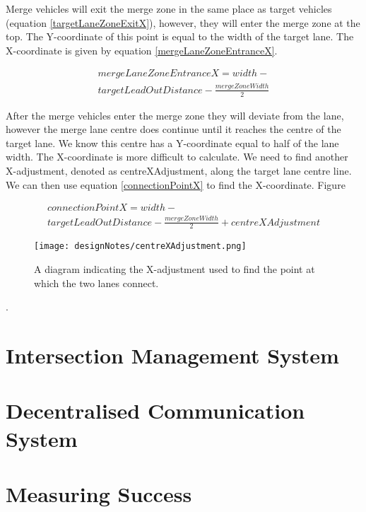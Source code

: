 Merge vehicles will exit the merge zone in the same place as target vehicles (equation \ref{targetLaneZoneExitX}), however, they will enter the merge zone at the top. The Y-coordinate of this point is equal to the width of the target lane. The X-coordinate is given by equation \ref{mergeLaneZoneEntranceX}.

\begin{multline}\label{mergeLaneZoneEntranceX}
mergeLaneZoneEntranceX = width - \\
targetLeadOutDistance - \frac{mergeZoneWidth}{2}
\end{multline}

After the merge vehicles enter the merge zone they will deviate from the lane, however the merge lane centre does continue until it reaches the centre of the target lane. We know this centre has a Y-coordinate equal to half of the lane width. The X-coordinate is more difficult to calculate. We need to find another X-adjustment, denoted as centreXAdjustment, along the target lane centre line. We can then use equation \ref{connectionPointX} to find the X-coordinate. Figure 

\begin{multline}\label{connectionPointX}
connectionPointX = width - \\
targetLeadOutDistance - \frac{mergeZoneWidth}{2} + centreXAdjustment
\end{multline}

\begin{figure}[htb]
\texttt{[image: designNotes/centreXAdjustment.png]}
\caption{A diagram indicating the X-adjustment used to find the point at which the two lanes connect.}
\label{fig:centreXAdjustment}
\end{figure}.

\section{Intersection Management System}
\label{subsec:Intersection Management System}

\section{Decentralised Communication System}
\label{subsec:Decentralised Communication System}

\section{Measuring Success}
\label{subsec:Measuring Success}
